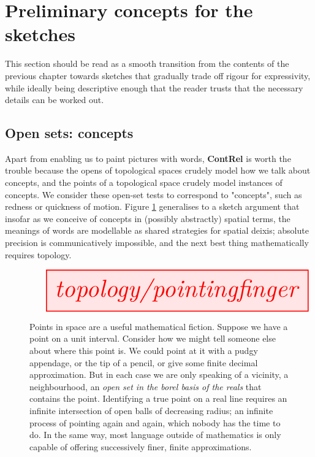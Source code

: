 \section{Preliminary concepts for the sketches}

This section should be read as a smooth transition from the contents of the previous chapter towards sketches that gradually trade off rigour for expressivity, while ideally being descriptive enough that the reader trusts that the necessary details can be worked out.

\subsection{Open sets: concepts}

Apart from enabling us to paint pictures with words, \textbf{ContRel} is worth the trouble because the opens of topological spaces crudely model how we talk about concepts, and the points of a topological space crudely model instances of concepts. We consider these open-set tests to correspond to "concepts", such as redness or quickness of motion. Figure \ref{fig:pointing} generalises to a sketch argument that insofar as we conceive of concepts in (possibly abstractly) spatial terms, the meanings of words are modellable as shared strategies for spatial deixis; absolute precision is communicatively impossible, and the next best thing mathematically requires topology.

\begin{figure}[h!]\label{fig:pointing}
\[\resizebox{\textwidth}{!}{\tikzfig{topology/pointingfinger}}\]
\caption{Points in space are a useful mathematical fiction. Suppose we have a point on a unit interval. Consider how we might tell someone else about where this point is. We could point at it with a pudgy appendage, or the tip of a pencil, or give some finite decimal approximation. But in each case we are only speaking of a vicinity, a neighbourhood, an \emph{open set in the borel basis of the reals} that contains the point. Identifying a true point on a real line requires an infinite intersection of open balls of decreasing radius; an infinite process of pointing again and again, which nobody has the time to do. In the same way, most language outside of mathematics is only capable of offering successively finer, finite approximations.}
\end{figure}

